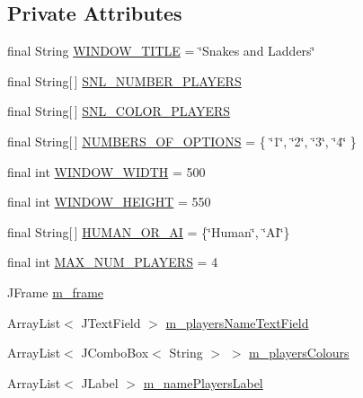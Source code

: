 \subsection*{Private Attributes}
\begin{DoxyCompactItemize}
\item 
final String \hyperlink{class_menu_1_1_menu_sn_l_a62bbb19bbedcdf63b575b4ae1048c343}{W\+I\+N\+D\+O\+W\+\_\+\+T\+I\+T\+L\+E} = \char`\"{}Snakes and Ladders\char`\"{}
\item 
final String\mbox{[}$\,$\mbox{]} \hyperlink{class_menu_1_1_menu_sn_l_accdb88464884a651bab3a9ebb5eb2beb}{S\+N\+L\+\_\+\+N\+U\+M\+B\+E\+R\+\_\+\+P\+L\+A\+Y\+E\+R\+S}
\item 
final String\mbox{[}$\,$\mbox{]} \hyperlink{class_menu_1_1_menu_sn_l_aa0aa3bcb48114b48faa0a49fa0c98504}{S\+N\+L\+\_\+\+C\+O\+L\+O\+R\+\_\+\+P\+L\+A\+Y\+E\+R\+S}
\item 
final String\mbox{[}$\,$\mbox{]} \hyperlink{class_menu_1_1_menu_sn_l_aa0ead71ad043fc5f187fde721b34c34b}{N\+U\+M\+B\+E\+R\+S\+\_\+\+O\+F\+\_\+\+O\+P\+T\+I\+O\+N\+S} = \{ \char`\"{}1\char`\"{}, \char`\"{}2\char`\"{}, \char`\"{}3\char`\"{}, \char`\"{}4\char`\"{} \}
\item 
final int \hyperlink{class_menu_1_1_menu_sn_l_a2fcacd6fe04ce3a540d0d100ca57b993}{W\+I\+N\+D\+O\+W\+\_\+\+W\+I\+D\+T\+H} = 500
\item 
final int \hyperlink{class_menu_1_1_menu_sn_l_a32c2e05c64b453df29d8b6df1061a939}{W\+I\+N\+D\+O\+W\+\_\+\+H\+E\+I\+G\+H\+T} = 550
\item 
final String\mbox{[}$\,$\mbox{]} \hyperlink{class_menu_1_1_menu_sn_l_a7cd650c1f3cf334aafb3be5b3ad1b158}{H\+U\+M\+A\+N\+\_\+\+O\+R\+\_\+\+A\+I} = \{\char`\"{}Human\char`\"{}, \char`\"{}A\+I\char`\"{}\}
\item 
final int \hyperlink{class_menu_1_1_menu_sn_l_afc7fd19db34602b6b5a85df60c736103}{M\+A\+X\+\_\+\+N\+U\+M\+\_\+\+P\+L\+A\+Y\+E\+R\+S} = 4
\item 
J\+Frame \hyperlink{class_menu_1_1_menu_sn_l_af43a9353bb0cfe3d29fa37d67b794a65}{m\+\_\+frame}
\item 
Array\+List$<$ J\+Text\+Field $>$ \hyperlink{class_menu_1_1_menu_sn_l_a8e5b5896ffe07afef10443fe99b45dab}{m\+\_\+players\+Name\+Text\+Field}
\item 
Array\+List$<$ J\+Combo\+Box$<$ String $>$ $>$ \hyperlink{class_menu_1_1_menu_sn_l_a99b5b387a1ff9257d77534ebff7ca370}{m\+\_\+players\+Colours}
\item 
Array\+List$<$ J\+Label $>$ \hyperlink{class_menu_1_1_menu_sn_l_ab29efffc6315a328efb34fed209c0677}{m\+\_\+name\+Players\+Label}

\end{DoxyCompactItemize}
